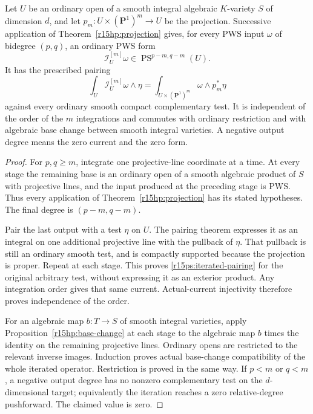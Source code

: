 \begin{proposition}
\label{r15ps:iterated-lines}
Let $U$ be an ordinary open of a smooth integral algebraic
$K$-variety $S$ of dimension $d$, and let
$p_m:U\times(\mathbf P^1)^m\to U$ be the projection.
Successive application of Theorem~\ref{r15hp:projection}
gives, for every PWS input $\omega$ of bidegree $(p,q)$,
an ordinary PWS form
\[
 \mathcal I^{[m]}_U\omega\in
                    \operatorname{PS}^{p-m,q-m}(U).
\tag{PS15.3}\label{r15ps:iterated-output}
\]
It has the prescribed pairing
\[
 \int_U\mathcal I^{[m]}_U\omega\wedge\eta
      =\int_{U\times(\mathbf P^1)^m}\omega\wedge p_m^*\eta
\tag{PS15.4}\label{r15ps:iterated-pairing}
\]
against every ordinary smooth compact complementary test.
It is independent of the order of the $m$ integrations and
commutes with ordinary restriction and with algebraic base
change between smooth integral varieties.  A negative output
degree means the zero current and the zero form.
\end{proposition}

\begin{proof}
For $p,q\geq m$, integrate one projective-line coordinate at
a time.  At every stage the remaining base is an ordinary open
of a smooth algebraic product of $S$ with projective lines, and
the input produced at the preceding stage is PWS.
Thus every application of Theorem~\ref{r15hp:projection} has
its stated hypotheses.  The final degree is $(p-m,q-m)$.

Pair the last output with a test $\eta$ on $U$.  The pairing
theorem expresses it as an integral on one additional projective
line with the pullback of $\eta$.  That pullback is still an
ordinary smooth test, and is compactly supported because the
projection is proper.  Repeat at each stage.  This proves
\eqref{r15ps:iterated-pairing} for the original arbitrary test,
without expressing it as an exterior product.  Any integration
order gives that same current.  Actual-current injectivity
therefore proves independence of the order.

For an algebraic map $b:T\to S$ of smooth integral varieties,
apply Proposition~\ref{r15hp:base-change} at each stage to the
algebraic map $b$ times the identity on the remaining projective
lines.  Ordinary opens are restricted to the relevant inverse
images.  Induction proves actual base-change compatibility
of the whole iterated operator.  Restriction is proved in the
same way.  If $p<m$ or $q<m$, a negative output degree has no
nonzero complementary test on the $d$-dimensional target;
equivalently the iteration reaches a zero relative-degree
pushforward.  The claimed value is zero.
\end{proof}

